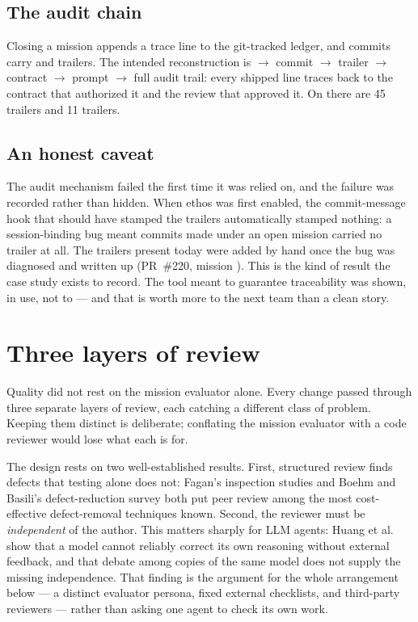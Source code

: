 \documentclass[11pt,a4paper]{article}
\begin{document}
\subsection{The audit chain}

Closing a mission appends a trace line to the git-tracked ledger, and
commits carry  and  trailers. The intended
reconstruction is  $\to$ commit $\to$ trailer $\to$
contract $\to$ prompt $\to$ full audit trail: every shipped line traces
back to the contract that authorized it and the review that approved it. On
 there are 45  trailers and 11
 trailers.

\subsection{An honest caveat}

The audit mechanism failed the first time it was relied on, and the failure
was recorded rather than hidden. When ethos was first enabled, the
commit-message hook that should have stamped the trailers automatically
stamped nothing: a session-binding bug meant commits made under an open
mission carried no trailer at all. The trailers present today were added by
hand once the bug was diagnosed and written up (PR~\#220, mission
). This is the kind of result the case study
exists to record. The tool meant to guarantee traceability was shown, in
use, not to --- and that is worth more to the next team than a clean story.

\section{Three layers of review}
\label{sec:review-layers}

Quality did not rest on the mission evaluator alone. Every change passed
through three separate layers of review, each catching a different class of
problem. Keeping them distinct is deliberate; conflating the mission
evaluator with a code reviewer would lose what each is for.

The design rests on two well-established results. First, structured review
finds defects that testing alone does not: Fagan's inspection studies
\citep{fagan1976} and Boehm and Basili's defect-reduction survey
\citep{boehm2001} both put peer review among the most cost-effective
defect-removal techniques known. Second, the reviewer must be
\emph{independent} of the author. This matters sharply for LLM agents:
Huang et al.\ \citep{huang2024} show that a model cannot reliably correct its
own reasoning without external feedback, and that debate among copies of the
same model does not supply the missing independence. That finding is the
argument for the whole arrangement below --- a distinct evaluator persona,
fixed external checklists, and third-party reviewers --- rather than asking
one agent to check its own work.
\end{document}
